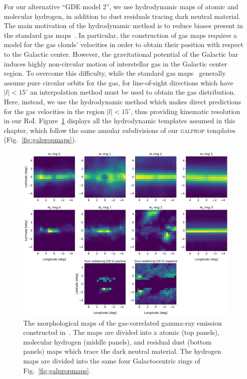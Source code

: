 \documentclass[doublespace,nopageskip]{VTthesis}
\begin{document}
For our alternative ``GDE model 2'', we use hydrodynamic maps of atomic and molecular hydrogen, in addition to dust residuals tracing dark neutral material. The main motivation of the hydrodynamic method is to reduce biases present in the standard gas maps~\citep{2012ApJ...750....3A}. In particular, the construction of gas maps requires a model for the gas clouds' velocities in order to obtain their position with respect to the Galactic center. 
However, the gravitational potential of the Galactic bar induces highly non-circular motion of interstellar gas in the Galactic center region. 
%
To overcome this difficulty, while the standard gas maps~\citep{2012ApJ...750....3A} generally assume pure circular orbits for the gas, for line-of-sight directions which have $\lvert l \rvert < 15^\circ $ an interpolation method must be used to obtain the gas distribution. 
%
Here, instead, we use the hydrodynamic method \citep{2008ApJ...677..283P,2018NatAs...2..387M} which makes direct predictions for the gas velocities in the region $\lvert l \rvert < 15^\circ $, thus providing kinematic resolution in our RoI. Figure~\ref{fig:hydro_maps} displays all the hydrodynamic templates assumed in this chapter, which follow the same annular subdivisions of our \textsc{galprop} templates (Fig.~\ref{fig:galpropmaps}).

\begin{figure}[htb!]
    \centering
    \includegraphics[width=\textwidth]{Figures/CTA/maps_mis.pdf}
    \caption{The morphological maps of the gas-correlated gamma-ray emission constructed in~\citet{2018NatAs...2..387M}. The maps are divided into a atomic (top panels), molecular hydrogen (middle panels), and residual dust (bottom panels) maps which trace the dark neutral material. The hydrogen maps are divided into the same four Galactocentric rings of Fig.~\ref{fig:galpropmaps}.}
    \label{fig:hydro_maps}
\end{figure}
\end{document}
